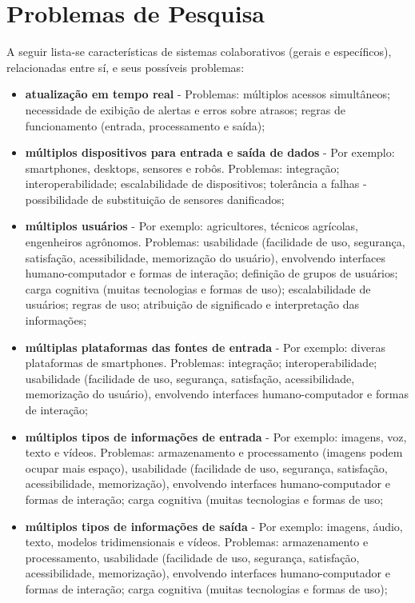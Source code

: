 \documentclass[12pt]{article}
\begin{document}



\appendix

\section{Problemas de Pesquisa}
\label{ape:problemas}

A seguir lista-se características de sistemas colaborativos (gerais e específicos), relacionadas entre sí, e seus possíveis problemas:

\begin{itemize}
	\item \textbf{atualização em tempo real} - Problemas: múltiplos acessos simultâneos; necessidade de exibição de alertas e erros sobre atrasos; regras de funcionamento (entrada, processamento e saída);
	\item \textbf{múltiplos dispositivos para entrada e saída de dados} - Por exemplo: smartphones, desktops, sensores e robôs. Problemas: integração; interoperabilidade; escalabilidade de dispositivos; tolerância a falhas - possibilidade de substituição de sensores danificados;
	\item \textbf{múltiplos usuários} - Por exemplo: agricultores, técnicos agrícolas, engenheiros agrônomos. Problemas: usabilidade (facilidade de uso, segurança, satisfação, acessibilidade, memorização do usuário), envolvendo interfaces humano-computador e formas de interação; definição de grupos de usuários; carga cognitiva (muitas tecnologias e formas de uso); escalabilidade de usuários; regras de uso; atribuição de significado e interpretação das informações;
	\item \textbf{múltiplas plataformas das fontes de entrada} - Por exemplo: diveras plataformas de smartphones. Problemas: integração; interoperabilidade; usabilidade (facilidade de uso, segurança, satisfação, acessibilidade, memorização do usuário), envolvendo interfaces humano-computador e formas de interação;
	\item \textbf{múltiplos tipos de informações de entrada} - Por exemplo: imagens, voz, texto e vídeos. Problemas: armazenamento e processamento (imagens podem ocupar mais espaço), usabilidade (facilidade de uso, segurança, satisfação, acessibilidade, memorização), envolvendo interfaces humano-computador e formas de interação; carga cognitiva (muitas tecnologias e formas de uso;
	\item \textbf{múltiplos tipos de informações de saída} - Por exemplo: imagens, áudio, texto, modelos tridimensionais e vídeos. Problemas: armazenamento e processamento, usabilidade (facilidade de uso, segurança, satisfação, acessibilidade, memorização), envolvendo interfaces humano-computador e formas de interação; carga cognitiva (muitas tecnologias e formas de uso);

\end{itemize}
\end{document}

